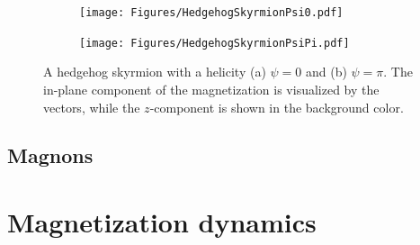 \documentclass[12pt, a4paper, twoside, openright]{report}
\numberwithin{equation}{chapter}
\numberwithin{figure}{chapter}
\numberwithin{table}{chapter}
\begin{document}
\begin{figure}[h!]
\centering
\begin{subfigure}{.49\textwidth}
  \centering
  \texttt{[image: Figures/HedgehogSkyrmionPsi0.pdf]}
  \caption{}
  \label{fig:HedgehogSkyrmion1}
\end{subfigure}
\begin{subfigure}{.49\textwidth}
  \centering
  \texttt{[image: Figures/HedgehogSkyrmionPsiPi.pdf]}
  \caption{}
  \label{fig:HedgehogSkyrmion2}
\end{subfigure}
\caption{A hedgehog skyrmion with a helicity (a) $\psi = 0$ and (b) $\psi = \pi$. The in-plane component of the magnetization is visualized by the vectors, while the $z$-component is shown in the background color.}
\label{fig:HedgehogSkyrmions}
\end{figure}

\section{Magnons}

\chapter{Magnetization dynamics}
\end{document}
